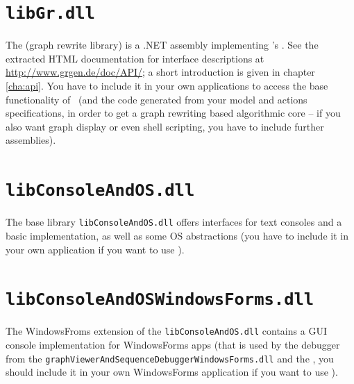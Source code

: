 \section{\texttt{libGr.dll}}
\label{sct:API}
The \LibGr{} (graph rewrite library) is a .NET assembly implementing \GrG's .
See the extracted HTML documentation for interface descriptions at \url{http://www.grgen.de/doc/API/};
a short introduction is given in chapter \ref{cha:api}.
You have to include it in your own applications to access the base functionality of \GrG\ (and the code generated from your model and actions specifications, in order to get a graph rewriting based algorithmic core -- if you also want graph display or even shell scripting, you have to include further assemblies).

\section{\texttt{libConsoleAndOS.dll}}
The base library \texttt{libConsoleAndOS.dll} offers interfaces for text consoles and a basic implementation, as well as some OS abstractions (you have to include it in your own application if you want to use \GrG).

\section{\texttt{libConsoleAndOSWindowsForms.dll}}
The WindowsFroms extension of the \texttt{libConsoleAndOS.dll} contains a GUI console implementation for WindowsForms apps (that is used by the debugger from the \texttt{graphViewerAndSequenceDebuggerWindowsForms.dll} and the \GGrShell, you should include it in your own WindowsForms application if you want to use \GrG).

